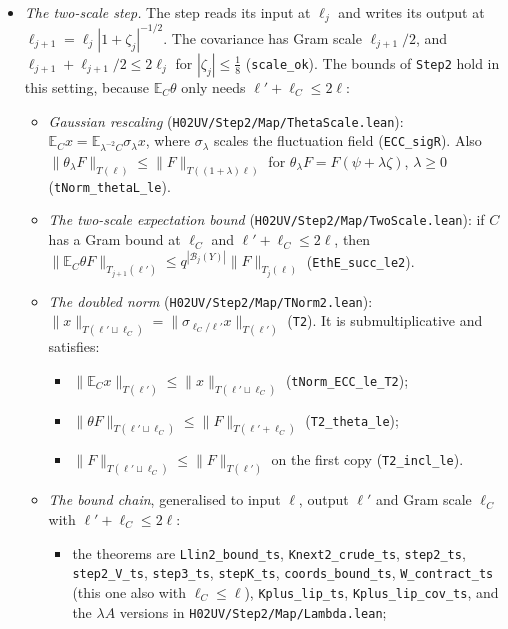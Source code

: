 \documentclass[11pt]{amsart}
\theoremstyle{definition}
\theoremstyle{remark}
\numberwithin{equation}{section}
\newcommand{\E}{\mathbb{E}}
\begin{document}
\begin{itemize}
\item \emph{The two-scale step.} The step reads its input at $\ell_j$ and writes its output at
  $\ell_{j+1}=\ell_j|1+\zeta_j|^{-1/2}$. The covariance has Gram scale $\ell_{j+1}/2$, and
  $\ell_{j+1}+\ell_{j+1}/2\le2\ell_j$ for $|\zeta_j|\le\frac18$ (\texttt{scale\_ok}). The bounds of
  \texttt{Step2} hold in this setting, because $\E_C\theta$ only needs $\ell'+\ell_C\le2\ell$:
  \begin{itemize}
  \item \emph{Gaussian rescaling} (\texttt{H02UV/Step2/Map/ThetaScale.lean}): $\E_Cx=\E_{\lambda^{-2}C}\sigma_\lambda x$,
    where $\sigma_\lambda$ scales the fluctuation field (\texttt{ECC\_sigR}). Also
    $\|\theta_\lambda F\|_{T(\ell)}\le\|F\|_{T((1+\lambda)\ell)}$ for $\theta_\lambda F=F(\psi+\lambda\zeta)$,
    $\lambda\ge0$ (\texttt{tNorm\_thetaL\_le}).
  \item \emph{The two-scale expectation bound} (\texttt{H02UV/Step2/Map/TwoScale.lean}): if $C$ has a Gram bound
    at $\ell_C$ and $\ell'+\ell_C\le2\ell$, then
    $\|\E_C\theta F\|_{T_{j+1}(\ell')}\le q^{|\mathcal B_j(Y)|}\|F\|_{T_j(\ell)}$ (\texttt{EthE\_succ\_le2}).
  \item \emph{The doubled norm} (\texttt{H02UV/Step2/Map/TNorm2.lean}):
    $\|x\|_{T(\ell'\sqcup\ell_C)}=\|\sigma_{\ell_C/\ell'}x\|_{T(\ell')}$ (\texttt{T2}). It is
    submultiplicative and satisfies:
    \begin{itemize}
    \item $\|\E_Cx\|_{T(\ell')}\le\|x\|_{T(\ell'\sqcup\ell_C)}$ (\texttt{tNorm\_ECC\_le\_T2});
    \item $\|\theta F\|_{T(\ell'\sqcup\ell_C)}\le\|F\|_{T(\ell'+\ell_C)}$ (\texttt{T2\_theta\_le});
    \item $\|F\|_{T(\ell'\sqcup\ell_C)}\le\|F\|_{T(\ell')}$ on the first copy (\texttt{T2\_incl\_le}).
    \end{itemize}
  \item \emph{The bound chain}, generalised to input $\ell$, output $\ell'$ and Gram scale $\ell_C$
    with $\ell'+\ell_C\le2\ell$:
    \begin{itemize}
    \item the theorems are \texttt{Llin2\_bound\_ts}, \texttt{Knext2\_crude\_ts}, \texttt{step2\_ts},
      \texttt{step2\_V\_ts}, \texttt{step3\_ts}, \texttt{stepK\_ts}, \texttt{coords\_bound\_ts},
      \texttt{W\_contract\_ts} (this one also with $\ell_C\le\ell$), \texttt{Kplus\_lip\_ts},
      \texttt{Kplus\_lip\_cov\_ts}, and the $\lambda A$ versions in \texttt{H02UV/Step2/Map/Lambda.lean};

\end{itemize}
\end{itemize}
\end{itemize}
\end{document}
